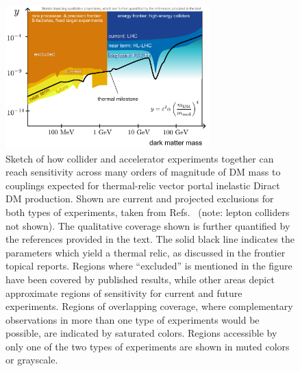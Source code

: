 \documentclass[nofootinbib]{article}
\begin{document}
\begin{figure}[htp]
\begin{center}
\includegraphics[width=0.7\textwidth]{Figures/DarkPhoton.pdf}
\end{center}
\caption{Sketch of how collider and accelerator experiments together can reach sensitivity across many orders of magnitude of DM mass to couplings expected for thermal-relic vector portal inelastic Diract DM production. Shown are current and projected exclusions for both types of experiments, taken from Refs.~\cite{Bose:2022obr,Boveia:2022jox,RF6report} (note: lepton colliders not shown). The qualitative coverage shown is further quantified by the references provided in the text. The solid black line indicates the parameters which yield a thermal relic, as discussed in the frontier topical reports. 
Regions where “excluded” is mentioned in the figure have been covered by published results, while other areas depict approximate regions of sensitivity for current and future experiments. 
Regions of overlapping coverage, where complementary observations in more than one type of experiments would be possible, are indicated by saturated colors. Regions accessible by only one of the two types of experiments are shown in muted colors or grayscale.}
\label{fig:darkPhoton}
\end{figure}
\end{document}
